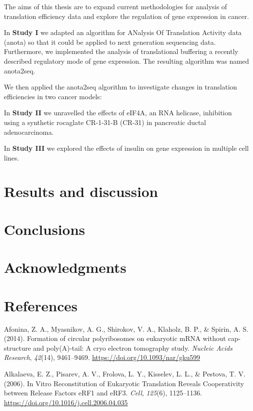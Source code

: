 \documentclass[12pt,openany]{book}
\begin{document}
The aims of this thesis are to expand current methodologies for analysis
of translation efficiency data and explore the regulation of gene
expression in cancer.

In \textbf{Study I} we adapted an algorithm for ANalysis Of Translation
Activity data (anota) so that it could be applied to next generation
sequencing data. Furthermore, we implemented the analysis of
translational buffering a recently described regulatory mode of gene
expression. The resulting algorithm was named anota2seq.

We then applied the anota2seq algorithm to investigate changes in
translation efficiencies in two cancer models:

In \textbf{Study II} we unravelled the effects of eIF4A, an RNA
helicase, inhibition using a synthetic rocaglate CR-1-31-B (CR-31) in
pancreatic ductal adenocarcinoma.

In \textbf{Study III} we explored the effects of insulin on gene
expression in multiple cell lines.

\chapter{Results and discussion}

\chapter{Conclusions}

\chapter*{Acknowledgments}\label{acknowledgments}

\chapter*{References}\label{references}

\hypertarget{refs}{}
\hypertarget{ref-Afonina2014}{}
Afonina, Z. A., Myasnikov, A. G., Shirokov, V. A., Klaholz, B. P., \&
Spirin, A. S. (2014). Formation of circular polyribosomes on eukaryotic
mRNA without cap-structure and poly(A)-tail: A cryo electron tomography
study. \emph{Nucleic Acids Research}, \emph{42}(14), 9461--9469.
\url{https://doi.org/10.1093/nar/gku599}

\hypertarget{ref-Alkalaeva2006}{}
Alkalaeva, E. Z., Pisarev, A. V., Frolova, L. Y., Kisselev, L. L., \&
Pestova, T. V. (2006). In Vitro Reconstitution of Eukaryotic Translation
Reveals Cooperativity between Release Factors eRF1 and eRF3.
\emph{Cell}, \emph{125}(6), 1125--1136.
\url{https://doi.org/10.1016/j.cell.2006.04.035}
\end{document}
